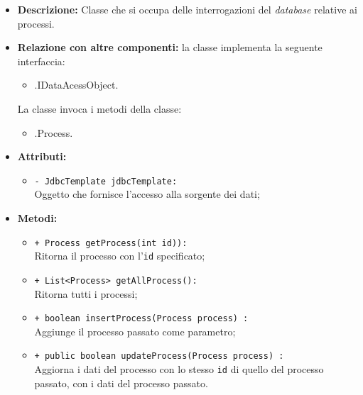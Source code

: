 \begin{flushleft}
\begin{itemize}
\item \textbf{Descrizione:} Classe che si occupa delle interrogazioni del \textit{database} relative ai processi.
\item \textbf{Relazione con altre componenti:} la classe implementa la seguente interfaccia:
		\begin{itemize}
			\item \smodel{}.IDataAcessObject.
		\end{itemize}
		La classe invoca i metodi della classe:
		\begin{itemize}
			\item \smodel{}.Process.
		\end{itemize}
\item \textbf{Attributi:}
\begin{sloppypar}
\begin{itemize}
\item \texttt{- JdbcTemplate jdbcTemplate:}\\ Oggetto che fornisce l'accesso alla sorgente dei dati;
\end{itemize}
\end{sloppypar}
\item \textbf{Metodi:}
\begin{sloppypar}
\begin{itemize}
\item \texttt{+ Process getProcess(int id)):}\\ Ritorna il processo con l'\texttt{id} specificato; 
\item \texttt{+ List<Process> getAllProcess():}\\ Ritorna tutti i processi;
\item \texttt{+ boolean insertProcess(Process process) :}\\ Aggiunge il processo passato come parametro;
\item \texttt{+ public boolean updateProcess(Process process) :}\\ Aggiorna i dati del processo con lo stesso \texttt{id} di quello del processo passato, con i dati del processo passato.
\end{itemize}
\end{sloppypar}
\end{itemize}
\end{flushleft}

